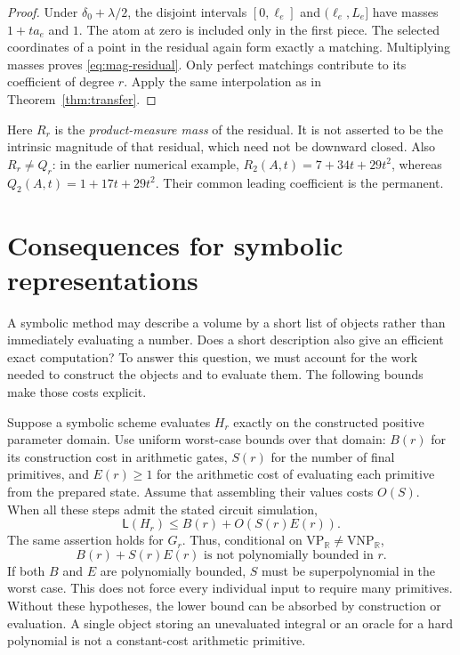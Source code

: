 \documentclass[12pt,a4paper]{article}
\theoremstyle{definition}
\theoremstyle{remark}
\newcommand{\R}{\mathbb R}
\newcommand{\VP}{\mathrm{VP}}
\newcommand{\VNP}{\mathrm{VNP}}
\newcommand{\size}{\mathsf L}
\begin{document}
\begin{proof}
Under $\delta_0+\lambda/2$, the disjoint intervals
$[0,\ell_e]$ and $(\ell_e,L_e]$ have masses $1+ta_e$ and $1$.
The atom at zero is included only in the first piece. The selected
coordinates of a point in the residual again form exactly a matching.
Multiplying masses proves \eqref{eq:mag-residual}. Only perfect matchings
contribute to its coefficient of degree $r$. Apply the same interpolation
as in Theorem~\ref{thm:transfer}.
\end{proof}

Here $R_r$ is the \emph{product-measure mass} of the residual. It is not
asserted to be the intrinsic magnitude of that residual, which need not
be downward closed. Also $R_r\ne Q_r$: in the earlier numerical example,
$R_2(A,t)=7+34t+29t^2$, whereas $Q_2(A,t)=1+17t+29t^2$.
Their common leading coefficient is the permanent.

\section{Consequences for symbolic representations}
\label{sec:primitives}

A symbolic method may describe a volume by a short list of objects
rather than immediately evaluating a number. Does a short description
also give an efficient exact computation? To answer this question, we
must account for the work needed to construct the objects and to
evaluate them. The following bounds make those costs explicit.

Suppose a symbolic scheme evaluates $H_r$ exactly on the constructed
positive parameter domain. Use uniform worst-case bounds over that
domain: $B(r)$ for its construction cost in arithmetic gates, $S(r)$
for the number of final primitives, and $E(r)\ge1$ for the arithmetic
cost of evaluating each primitive from the prepared state. Assume that
assembling their values costs $O(S)$.
When all these steps admit the stated circuit simulation,
\begin{equation}
 \size(H_r)\le B(r)+O(S(r)E(r)).
 \label{eq:primitive-upper}
\end{equation}
The same assertion holds for $G_r$. Thus, conditional on
$\VP_{\R}\ne\VNP_{\R}$,
\begin{equation}
 \boxed{B(r)+S(r)E(r)\text{ is not polynomially bounded in }r.}
 \label{eq:primitive-lower}
\end{equation}
If both $B$ and $E$ are polynomially bounded, $S$ must be
superpolynomial in the worst case. This does not force every individual
input to require many primitives. Without these hypotheses, the lower bound can be
absorbed by construction or evaluation. A single object storing an
unevaluated integral or an oracle for a hard polynomial is not a
constant-cost arithmetic primitive.
\end{document}
